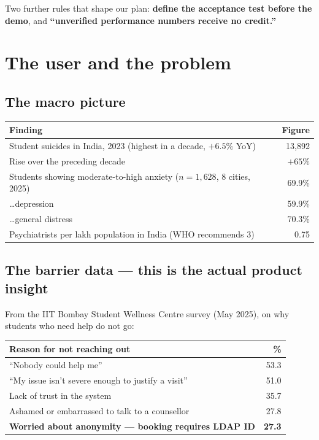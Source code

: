\documentclass[11pt,a4paper]{article}
\begin{document}
\vspace{0.3em}
Two further rules that shape our plan: \textbf{define the acceptance test before the demo},
and \textbf{``unverified performance numbers receive no credit.''}

\section{The user and the problem}

\subsection{The macro picture}

\begin{center}
\begin{tabular}{@{}p{9.5cm}r@{}}
\toprule
\textbf{Finding} & \textbf{Figure} \\
\midrule
Student suicides in India, 2023 (highest in a decade, $+6.5\%$ YoY) & 13{,}892 \\
Rise over the preceding decade & $+65\%$ \\
Students showing moderate-to-high anxiety ($n=1{,}628$, 8 cities, 2025) & 69.9\% \\
\dots depression & 59.9\% \\
\dots general distress & 70.3\% \\
Psychiatrists per lakh population in India (WHO recommends 3) & 0.75 \\
\bottomrule
\end{tabular}
\end{center}

\subsection{The barrier data --- this is the actual product insight}

From the IIT Bombay Student Wellness Centre survey (May 2025), on why students who
need help do not go:

\begin{center}
\begin{tabular}{@{}p{9.5cm}r@{}}
\toprule
\textbf{Reason for not reaching out} & \textbf{\%} \\
\midrule
``Nobody could help me'' & 53.3 \\
``My issue isn't severe enough to justify a visit'' & 51.0 \\
Lack of trust in the system & 35.7 \\
Ashamed or embarrassed to talk to a counsellor & 27.8 \\
\textbf{Worried about anonymity --- booking requires LDAP ID} & \textbf{27.3} \\
\bottomrule
\end{tabular}
\end{center}
\end{document}
